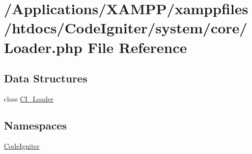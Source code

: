 \hypertarget{_loader_8php}{}\section{/\+Applications/\+X\+A\+M\+P\+P/xamppfiles/htdocs/\+Code\+Igniter/system/core/\+Loader.php File Reference}
\label{_loader_8php}
\subsection*{Data Structures}
\begin{DoxyCompactItemize}
\item 
class \mbox{\hyperlink{class_c_i___loader}{C\+I\+\_\+\+Loader}}
\end{DoxyCompactItemize}
\subsection*{Namespaces}
\begin{DoxyCompactItemize}
\item 
 \mbox{\hyperlink{namespace_code_igniter}{Code\+Igniter}}
\end{DoxyCompactItemize}
